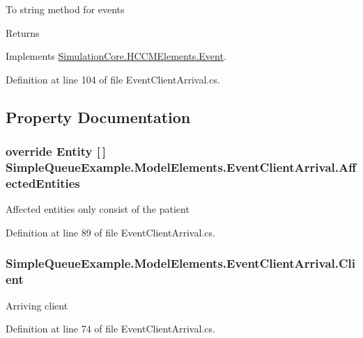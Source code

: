 To string method for events 

\begin{DoxyReturn}{Returns}

\end{DoxyReturn}


Implements \hyperlink{class_simulation_core_1_1_h_c_c_m_elements_1_1_event_a74668b01e4c7898939a3d98d6ee3a780}{Simulation\+Core.\+H\+C\+C\+M\+Elements.\+Event}.



Definition at line 104 of file Event\+Client\+Arrival.\+cs.



\subsection{Property Documentation}
\subsubsection[{\texorpdfstring{Affected\+Entities}{AffectedEntities}}]{\setlength{\rightskip}{0pt plus 5cm}override {\bf Entity} \mbox{[}$\,$\mbox{]} Simple\+Queue\+Example.\+Model\+Elements.\+Event\+Client\+Arrival.\+Affected\+Entities\hspace{0.3cm}{\ttfamily [get]}}\hypertarget{class_simple_queue_example_1_1_model_elements_1_1_event_client_arrival_a231c01aa3f3e5b894259d954af2bbd6c}{}\label{class_simple_queue_example_1_1_model_elements_1_1_event_client_arrival_a231c01aa3f3e5b894259d954af2bbd6c}


Affected entities only consist of the patient 



Definition at line 89 of file Event\+Client\+Arrival.\+cs.

\subsubsection[{\texorpdfstring{Client}{Client}}]{ Simple\+Queue\+Example.\+Model\+Elements.\+Event\+Client\+Arrival.\+Client\hspace{0.3cm}{\ttfamily [get]}}\hypertarget{class_simple_queue_example_1_1_model_elements_1_1_event_client_arrival_abbd0e3efc306016cdd41e581e57f7fcd}{}\label{class_simple_queue_example_1_1_model_elements_1_1_event_client_arrival_abbd0e3efc306016cdd41e581e57f7fcd}


Arriving client 



Definition at line 74 of file Event\+Client\+Arrival.\+cs.

